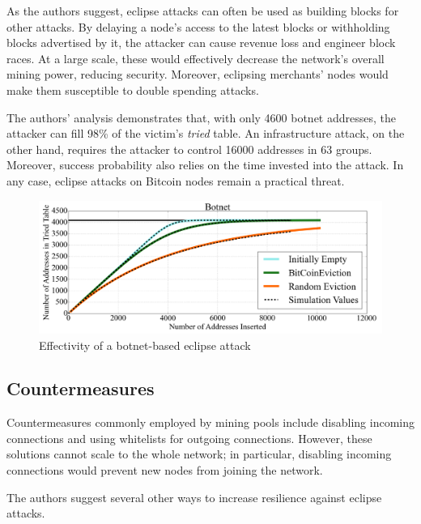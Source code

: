 \documentclass[12pt]{article}
\begin{document}
As the authors suggest, eclipse attacks can often be used as building blocks for other attacks. By delaying a node's access to the latest blocks or withholding blocks advertised by it, the attacker can cause revenue loss and engineer block races. At a large scale, these would effectively decrease the network's overall mining power, reducing security. Moreover, eclipsing merchants' nodes would make them susceptible to double spending attacks.

The authors' analysis demonstrates that, with only 4600 botnet addresses, the attacker can fill 98\% of the victim's \emph{tried} table. An infrastructure attack, on the other hand, requires the attacker to control 16000 addresses in 63 groups. Moreover, success probability also relies on the time invested into the attack. In any case, eclipse attacks on Bitcoin nodes remain a practical threat.

\begin{figure}
\centering
\includegraphics[width=0.85\columnwidth]{images/eclipse-botnet.png}
\caption{Effectivity of a botnet-based eclipse attack \cite{Heilman2015EclipseAO}}
\label{fig:eclipse-botnet}
\end{figure}

\subsection{Countermeasures}

Countermeasures commonly employed by mining pools include disabling incoming connections and using whitelists for outgoing connections. However, these solutions cannot scale to the whole network; in particular, disabling incoming connections would prevent new nodes from joining the network.

The authors suggest several other ways to increase resilience against eclipse attacks.
\end{document}
